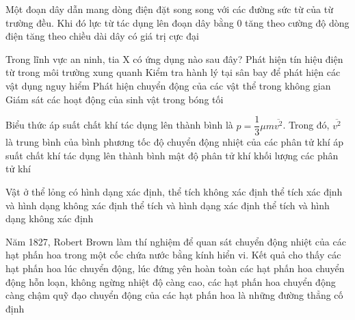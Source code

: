 	\begin{ex}%
		Một đoạn dây dẫn mang dòng điện đặt song song với các đường sức từ của từ trường đều. Khi đó lực từ tác dụng lên đoạn dây
		\choice
		{\True bằng $0$}
		{tăng theo cường độ dòng điện}
		{tăng theo chiều dài dây}
		{có giá trị cực đại}
	\end{ex}

	\begin{ex}%
		Trong lĩnh vực an ninh, tia X có ứng dụng nào sau đây?
		\choice
		{Phát hiện tín hiệu điện từ trong môi trường xung quanh}
		{\True Kiểm tra hành lý tại sân bay để phát hiện các vật dụng nguy hiểm}
		{Phát hiện chuyển động của các vật thể trong không gian}
		{Giám sát các hoạt động của sinh vật trong bóng tối}
	\end{ex}

	\begin{ex}%
		Biểu thức áp suất chất khí tác dụng lên thành bình là $p=\dfrac{1}{3}\mu m\overline{v^2}$. Trong đó, $\overline{v^2}$ là
		\choice
		{\True trung bình của bình phương tốc độ chuyển động nhiệt của các phân tử khí}
		{áp suất chất khí tác dụng lên thành bình}
		{mật độ phân tử khí}
		{khối lượng các phân tử khí}
	\end{ex}

	\begin{ex}%
		Vật ở thể lỏng có
		\choice
		{hình dạng xác định, thể tích không xác định}
		{\True thể tích xác định và hình dạng không xác định}
		{thể tích và hình dạng xác định}
		{thể tích và hình dạng không xác định}
	\end{ex}

	\begin{ex}%
		Năm 1827, Robert Brown làm thí nghiệm để quan sát chuyển động nhiệt của các hạt phấn hoa trong một cốc chứa nước bằng kính hiển vi. Kết quả cho thấy
		\choice
		{các hạt phấn hoa lúc chuyển động, lúc đứng yên hoàn toàn}
		{\True các hạt phấn hoa chuyển động hỗn loạn, không ngừng}
		{nhiệt độ càng cao, các hạt phấn hoa chuyển động càng chậm}
		{quỹ đạo chuyển động của các hạt phấn hoa là những đường thẳng cố định}
	\end{ex}


